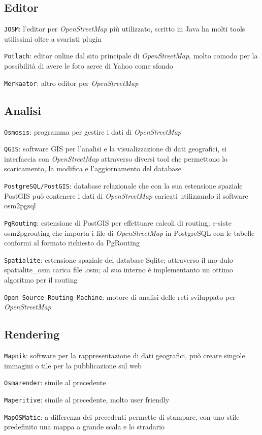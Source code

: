 \documentclass[a4paper,twoside,12pt,]{article}
\newcommand{\osm}{\emph{OpenStreetMap}\xspace}
\newcommand{\soft}[1]{\texttt{#1}}
\begin{document}
\subsection{Editor}
\soft{JOSM}: l'editor per \osm più utilizzato, scritto in Java ha molti tools utilissimi oltre a svariati plugin

\soft{Potlach}: editor online dal sito principale di \osm, molto comodo per la possibilità di avere le foto aeree di Yahoo come sfondo

\soft{Merkaator}: altro editor per \osm

\subsection{Analisi}
\soft{Osmosis}: programma per gestire i dati di \osm

\soft{QGIS}: software GIS per l'analisi e la visualizzazione di dati geografici, si interfaccia con \osm attraverso diversi tool che permettono lo scaricamento, la modifica e l'aggiornamento del database

\soft{PostgreSQL/PostGIS}: database relazionale che con la sua estensione spaziale PostGIS può contenere i dati di \osm caricati utilizzando il software osm2pgsql

\soft{PgRouting}: estensione di PostGIS per effettuare calcoli di routing; e-siste osm2pgrouting che importa i file di \osm in PostgreSQL con le tabelle conformi al formato richiesto da PgRouting

\soft{Spatialite}: estensione spaziale del database Sqlite; attraverso il mo-dulo spatialite\_osm carica file .osm; al suo interno è implementanto un ottimo algoritmo per il routing 

\soft{Open Source Routing Machine}: motore di analisi delle reti sviluppato per \osm


\subsection{Rendering}

\soft{Mapnik}: software per la rappresentazione di dati geografici, può creare singole immagini o tile per la pubblicazione sul web

\soft{Osmarender}: simile al precedente

\soft{Maperitive}: simile al precedente, molto user friendly

\soft{MapOSMatic}: a differenza dei precedenti permette di stampare, con uno stile predefinito una mappa a grande scala e lo stradario
\end{document}
